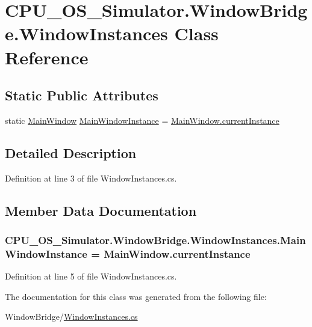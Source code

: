 \hypertarget{class_c_p_u___o_s___simulator_1_1_window_bridge_1_1_window_instances}{}\section{C\+P\+U\+\_\+\+O\+S\+\_\+\+Simulator.\+Window\+Bridge.\+Window\+Instances Class Reference}
\label{class_c_p_u___o_s___simulator_1_1_window_bridge_1_1_window_instances}
\subsection*{Static Public Attributes}
\begin{DoxyCompactItemize}
\item 
static \hyperlink{class_c_p_u___o_s___simulator_1_1_main_window}{Main\+Window} \hyperlink{class_c_p_u___o_s___simulator_1_1_window_bridge_1_1_window_instances_a130a2c32e8ccfd51a42ecb363fbb42cc}{Main\+Window\+Instance} = \hyperlink{class_c_p_u___o_s___simulator_1_1_main_window_a1280266cc57403a91f08a8350dee05cc}{Main\+Window.\+current\+Instance}
\end{DoxyCompactItemize}


\subsection{Detailed Description}


Definition at line 3 of file Window\+Instances.\+cs.



\subsection{Member Data Documentation}
\hypertarget{class_c_p_u___o_s___simulator_1_1_window_bridge_1_1_window_instances_a130a2c32e8ccfd51a42ecb363fbb42cc}{}
\subsubsection[{Main\+Window\+Instance}]{ C\+P\+U\+\_\+\+O\+S\+\_\+\+Simulator.\+Window\+Bridge.\+Window\+Instances.\+Main\+Window\+Instance = {\bf Main\+Window.\+current\+Instance}\hspace{0.3cm}{\ttfamily [static]}}\label{class_c_p_u___o_s___simulator_1_1_window_bridge_1_1_window_instances_a130a2c32e8ccfd51a42ecb363fbb42cc}


Definition at line 5 of file Window\+Instances.\+cs.



The documentation for this class was generated from the following file\+:\begin{DoxyCompactItemize}
\item 
Window\+Bridge/\hyperlink{_window_instances_8cs}{Window\+Instances.\+cs}\end{DoxyCompactItemize}
